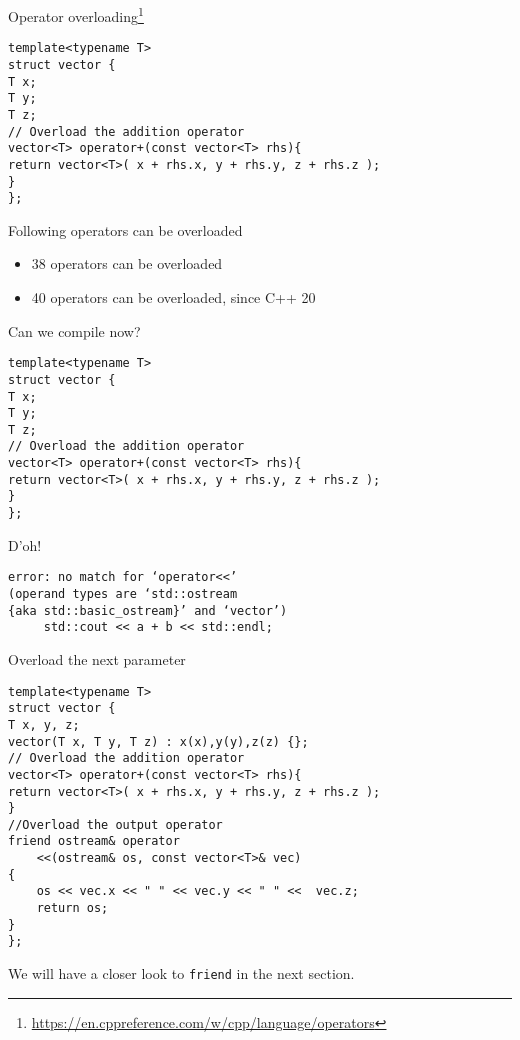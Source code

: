 \documentclass[\classoption]{beamer}
\begin{document}
\begin{frame}[fragile]{Operator overloading\footnote{\tiny\url{https://en.cppreference.com/w/cpp/language/operators}}}

\begin{lstlisting}
template<typename T>
struct vector {
T x;
T y;
T z;
// Overload the addition operator
vector<T> operator+(const vector<T> rhs){
return vector<T>( x + rhs.x, y + rhs.y, z + rhs.z );
}
};

\end{lstlisting}

\begin{block}{Following operators can be overloaded}
\begin{itemize}
\item 38 operators can be overloaded
\item 40 operators can be overloaded, since C++ 20
\end{itemize}
\end{block}
\end{frame}

\begin{frame}[fragile]{Can we compile now?}
\begin{lstlisting}
template<typename T>
struct vector {
T x;
T y;
T z;
// Overload the addition operator
vector<T> operator+(const vector<T> rhs){
return vector<T>( x + rhs.x, y + rhs.y, z + rhs.z );
}
};
\end{lstlisting}
\pause
\begin{block}{D'oh!}
\begin{lstlisting}
error: no match for ‘operator<<’ 
(operand types are ‘std::ostream 
{aka std::basic_ostream}’ and ‘vector’)
     std::cout << a + b << std::endl;
\end{lstlisting}
\end{block}
\end{frame}

\begin{frame}[fragile]{Overload the next parameter}
\begin{lstlisting}
template<typename T>
struct vector {
T x, y, z;
vector(T x, T y, T z) : x(x),y(y),z(z) {};
// Overload the addition operator
vector<T> operator+(const vector<T> rhs){
return vector<T>( x + rhs.x, y + rhs.y, z + rhs.z );
}
//Overload the output operator
friend ostream& operator
	<<(ostream& os, const vector<T>& vec)
{
    os << vec.x << " " << vec.y << " " <<  vec.z;
    return os;
}
};
\end{lstlisting}
\begin{center}
We will have a closer look to \lstinline|friend| in the next section.
\end{center}
\end{frame}
\end{document}
